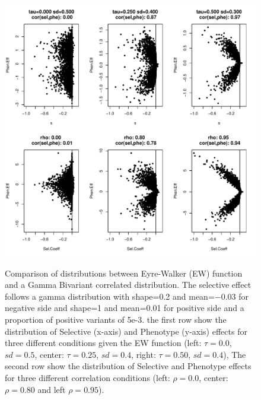 \documentclass[a4paper,11pt]{article}
\begin{document}
\begin{figure}[h]
{\includegraphics[scale=0.75]{./GammBiv_EW_plot_Fig1.pdf}}
\caption{Comparison of distributions between Eyre-Walker (EW) function and a Gamma Bivariant correlated distribution. The selective effect follows a gamma distribution with shape=0.2 and mean=$-0.03$ for negative side and shape=1 and mean=0.01 for positive side and a proportion of positive variants of 5e-3. the first row show the distribution of Selective (x-axis) and Phenotype (y-axis) effects for three different conditions given the EW function (left: $\tau=0.0$, $sd=0.5$, center: $\tau=0.25$, $sd=0.4$, right: $\tau=0.50$, $sd=0.4$), The second row show the distribution of Selective and Phenotype effects for three different correlation conditions (left: $\rho=0.0$, center: $\rho=0.80$ and  left $\rho=0.95$). }
\label{comEWvsBiv}
\hspace*{-0.5cm}
\end{figure}
\end{document}
